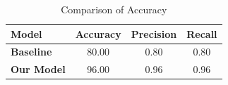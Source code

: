 \documentclass{article}
\begin{document}
\begin{table}[h]
\centering
\caption{Comparison of Accuracy}
\label{tab:accuracy}
\begin{tabular}{lccc}
\toprule
\textbf{Model} & \textbf{Accuracy} & \textbf{Precision} & \textbf{Recall} \\
\midrule
\textbf{Baseline} & 80.00 & 0.80 & 0.80 \\
\textbf{Our Model} & 96.00 & 0.96 & 0.96 \\
\bottomrule
\end{tabular}
\end{table}
\end{document}
